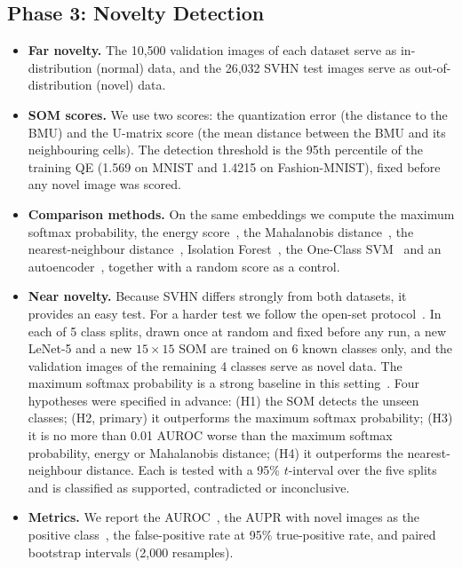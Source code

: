 \documentclass{scrartcl}
\begin{document}
\subsection{Phase 3: Novelty Detection}

\begin{itemize}
  \item \textbf{Far novelty.} The 10,500 validation images of each dataset serve as in-distribution (normal) data, and the 26,032 SVHN test images serve as out-of-distribution (novel) data.
  \item \textbf{SOM scores.} We use two scores: the quantization error (the distance to the BMU) and the U-matrix score (the mean distance between the BMU and its neighbouring cells). The detection threshold is the 95th percentile of the training QE (1.569 on MNIST and 1.4215 on Fashion-MNIST), fixed before any novel image was scored.
  \item \textbf{Comparison methods.} On the same embeddings we compute the maximum softmax probability, the energy score~\cite{liu2020energy}, the Mahalanobis distance~\cite{lee2018mahalanobis}, the nearest-neighbour distance~\cite{sun2022knn}, Isolation Forest~\cite{liu2008isolation}, the One-Class SVM~\cite{scholkopf2001support} and an autoencoder~\cite{sakurada2014autoencoder}, together with a random score as a control.
  \item \textbf{Near novelty.} Because SVHN differs strongly from both datasets, it provides an easy test. For a harder test we follow the open-set protocol~\cite{neal2018open}. In each of 5 class splits, drawn once at random and fixed before any run, a new LeNet-5 and a new $15\times15$ SOM are trained on 6 known classes only, and the validation images of the remaining 4 classes serve as novel data. The maximum softmax probability is a strong baseline in this setting~\cite{vaze2022openset}. Four hypotheses were specified in advance: (H1) the SOM detects the unseen classes; (H2, primary) it outperforms the maximum softmax probability; (H3) it is no more than 0.01 AUROC worse than the maximum softmax probability, energy or Mahalanobis distance; (H4) it outperforms the nearest-neighbour distance. Each is tested with a 95\% $t$-interval over the five splits and is classified as supported, contradicted or inconclusive.
  \item \textbf{Metrics.} We report the AUROC~\cite{fawcett2006roc}, the AUPR with novel images as the positive class~\cite{saito2015pr}, the false-positive rate at 95\% true-positive rate, and paired bootstrap intervals (2,000 resamples).
\end{itemize}
\end{document}
